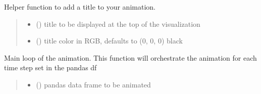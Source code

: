 \documentclass[letterpaper,10pt,english]{sphinxmanual}
\begin{document}
\begin{fulllineitems}
\begin{fulllineitems}
\label{\detokenize{index:sjvisualizer.Canvas.canvas.add_title}}
\pysigstartsignatures
{}
\pysigstopsignatures
\sphinxAtStartPar
Helper function to add a title to your animation.
\begin{quote}\begin{description}
\begin{itemize}
\item {} 
\sphinxAtStartPar
{} () \textendash{} title to be displayed at the top of the visualization

\item {} 
\sphinxAtStartPar
{} () \textendash{} title color in RGB, defaults to (0, 0, 0) black

\end{itemize}

\end{description}\end{quote}

\end{fulllineitems}


\begin{fulllineitems}
\label{\detokenize{index:sjvisualizer.Canvas.canvas.play}}
\pysigstartsignatures
{}
\pysigstopsignatures
\sphinxAtStartPar
Main loop of the animation. This function will orchestrate the animation for each time step set in the pandas df
\begin{quote}\begin{description}
\begin{itemize}
\item {} 
\sphinxAtStartPar
{} () \textendash{} pandas data frame to be animated


\end{itemize}
\end{description}
\end{quote}
\end{fulllineitems}
\end{fulllineitems}
\end{document}
